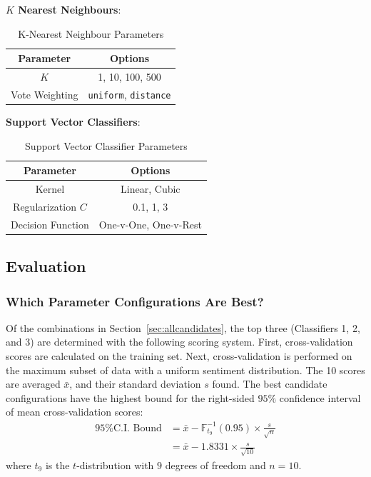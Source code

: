 \documentclass[11pt]{article}
\begin{document}
\textbf{$K$ Nearest Neighbours}:
\begin{table}[H]
	\begin{center}
		\begin{tabular}{|c|c|}			
			\hline
			Parameter & Options \\
			\hline
			$K$ & 1, 10, 100, 500 \\
			Vote Weighting & \texttt{uniform}, \texttt{distance} \\
			\hline
		\end{tabular}
		\caption{K-Nearest Neighbour Parameters}
		\label{tbl:knn-options}
	\end{center}
\end{table}

\textbf{Support Vector Classifiers}:
\begin{table}[H]
	\begin{center}
		\begin{tabular}{|c|c|}			
			\hline
			Parameter & Options \\
			\hline
			Kernel & Linear, Cubic \\
			Regularization $C$ & 0.1, 1, 3 \\
			Decision Function & One-v-One, One-v-Rest \\
			\hline
		\end{tabular}
		\caption{Support Vector Classifier Parameters}
		\label{tbl:svc-options}
	\end{center}
\end{table}


\subsection{Evaluation}\label{sec:evaluations}

\subsubsection{Which Parameter Configurations Are Best?}\label{sec:choosing2}

Of the combinations in Section~\ref{sec:allcandidates}, 
the top three (Classifiers 1, 2, and 3) are determined with the following scoring system.
First, cross-validation scores are calculated on the training set.
Next, cross-validation is performed on the maximum subset of data with a uniform sentiment distribution.
The 10 scores are averaged $\bar{x}$, and their standard deviation $s$ found. 
The best candidate configurations have the highest bound for the right-sided $95\%$ confidence interval of mean cross-validation scores:
\begin{align*}
	\text{95\% C.I. Bound} &= \bar{x} - \mathbb{F}_{t_9}^{-1}(0.95) \times \frac{s}{\sqrt{n}} \\
	&= \bar{x} - 1.8331 \times \frac{s}{\sqrt{10}}
\end{align*}
where $t_9$ is the $t$-distribution with $9$ degrees of freedom and $n = 10$.
\end{document}
